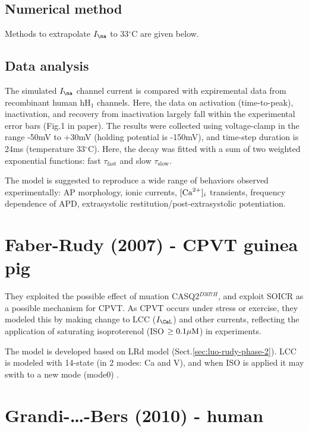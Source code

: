 \subsection{Numerical method}

Methods to extrapolate $I_\na$ to 33$^\circ$C are given below.

\subsection{Data analysis}

The simulated $I_\na$ channel current is compared with expiremental data from
recombinant human hH$_1$ channels. Here, the data on activation (time-to-peak),
inactivation, and recovery from inactivation largely fall within the
experimental error bars (Fig.1 in paper). The results were collected using
voltage-clamp in the range -50mV to +30mV (holding potential is -150mV), and
time-step duration is 24ms (temperature 33$^\circ$C). Here, the decay was fitted
with a sum of two weighted exponential functions: fast $\tau_\text{fast}$ and
slow $\tau_\text{slow}$.

The model is suggested to reproduce a wide range of behaviors observed
experimentally: AP morphology, ionic currents, $[{\text{Ca}^{2+}}]_i$ transients, frequency
dependence of APD, extrasystolic restitution/post-extrasystolic potentiation.





\section{Faber-Rudy (2007) - CPVT guinea pig}
\label{sec:Faber_Rudy_07}

They exploited the possible effect of muation CASQ2$^{D307H}$, and exploit SOICR
as a possible mechanism for CPVT. As CPVT occurs under stress or exercise, they
modeled this by making change to LCC ($I_\CaL$) and other currents, reflecting
the application of saturating isoproterenol (ISO $\ge 0.1{\mu\text{M}}$) in experiments.

The model is developed based on LRd model \citep{luo1994dmc_b}
(Sect.\ref{sec:luo-rudy-phase-2}). LCC is modeled with 14-state (in 2 modes: Ca
and V), and when ISO is applied it  may swith to a new mode (mode0)
\citep{faber2007DHPR}.


\section{Grandi-\ldots-Bers (2010) - human}
\label{sec:Grandi-Bers_09}

\citep{grandi2010}


